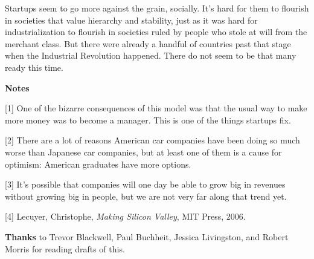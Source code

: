 Startups seem to go more against the grain, socially. It's hard for them
to flourish in societies that value hierarchy and stability, just as it
was hard for industrialization to flourish in societies ruled by people
who stole at will from the merchant class. But there were already a
handful of countries past that stage when the Industrial Revolution
happened. There do not seem to be that many ready this time.

\textbf{Notes}

{[}1{]} One of the bizarre consequences of this model was that the usual
way to make more money was to become a manager. This is one of the
things startups fix.

{[}2{]} There are a lot of reasons American car companies have been
doing so much worse than Japanese car companies, but at least one of
them is a cause for optimism: American graduates have more options.

{[}3{]} It's possible that companies will one day be able to grow big in
revenues without growing big in people, but we are not very far along
that trend yet.

{[}4{]} Lecuyer, Christophe, \emph{Making Silicon Valley}, MIT Press,
2006.

\textbf{Thanks} to Trevor Blackwell, Paul Buchheit, Jessica Livingston,
and Robert Morris for reading drafts of this.

